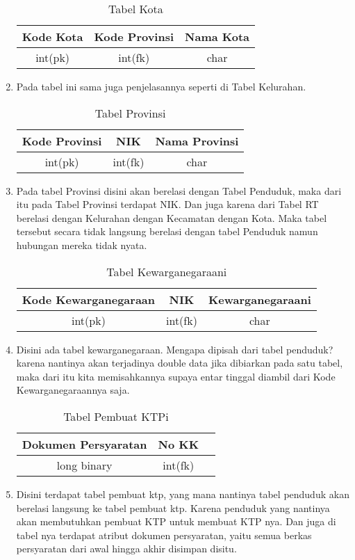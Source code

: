 \documentclass{article}
\begin{document}
\begin{enumerate}
\begin{table}[h]
\begin{center}
\begin{tabular}{|c|c|c|}
\hline
Kode Kota & Kode Provinsi & Nama Kota\\
\hline
int(pk) & int(fk) & char\\
\hline
\end{tabular}
\caption{Tabel Kota}
\end{center}
\end{table}
\item Pada tabel ini sama juga penjelasannya seperti di Tabel Kelurahan.
\begin{table}[h]
\begin{center}
\begin{tabular}{|c|c|c|}
\hline
Kode Provinsi & NIK & Nama Provinsi\\
\hline
int(pk) & int(fk) & char\\
\hline
\end{tabular}
\caption{Tabel Provinsi}
\end{center}
\end{table}
\item Pada tabel Provinsi disini akan berelasi dengan Tabel Penduduk, maka dari itu pada Tabel Provinsi terdapat NIK. Dan juga karena dari Tabel RT berelasi dengan Kelurahan dengan Kecamatan dengan Kota. Maka tabel tersebut secara tidak langsung berelasi dengan tabel Penduduk namun hubungan mereka tidak nyata.

\newpage
\begin{table}[h]
\begin{center}
\begin{tabular}{|c|c|c|}
\hline
Kode Kewarganegaraan & NIK & Kewarganegaraani\\
\hline
int(pk) & int(fk) & char\\
\hline
\end{tabular}
\caption{Tabel Kewarganegaraani}
\end{center}
\end{table}
\item Disini ada tabel kewarganegaraan. Mengapa dipisah dari tabel penduduk? karena nantinya akan terjadinya double data jika dibiarkan pada satu tabel, maka dari itu kita memisahkannya supaya entar tinggal diambil dari Kode Kewarganegaraannya saja.

\begin{table}[h]
\begin{center}
\begin{tabular}{|c|c|c|}
\hline
Dokumen Persyaratan & No KK\\
\hline
long binary & int(fk)\\
\hline
\end{tabular}
\caption{Tabel Pembuat KTPi}
\end{center}
\end{table}
\item Disini terdapat tabel pembuat ktp, yang mana nantinya tabel penduduk akan berelasi langsung ke tabel pembuat ktp. Karena penduduk yang nantinya akan membutuhkan pembuat KTP untuk membuat KTP nya. Dan juga di tabel nya terdapat atribut dokumen persyaratan, yaitu semua berkas persyaratan dari awal hingga akhir disimpan disitu.


\end{enumerate}
\end{document}
